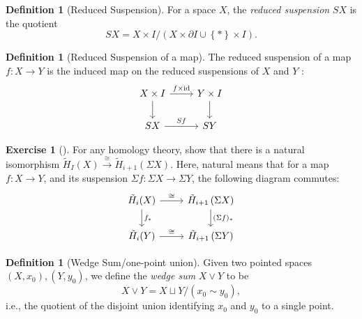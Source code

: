 \documentclass[reqno]{amsart}
\theoremstyle{definition}
\newtheorem{definition}[theorem]{Definition}
\newtheorem{exercise}[theorem]{Exercise}
\theoremstyle{remark}
\newcommand{\id}{{\mathrm{id}}}
\begin{document}
\begin{definition}[Reduced Suspension]
    For a space $X$, the \textit{reduced suspension}
    $SX$ is the quotient
    \[
    SX = X \times I / \left( X \times \partial I
    \cup \left\{ * \right\} \times I \right) .
    \] 
\end{definition}

\begin{definition}[Reduced Suspension of a map]
    The reduced suspension of a map $f \colon X \to Y$ is
    the induced map on the reduced suspensions of
    $X$ and $Y$ :
    \begin{equation*}
    \begin{tikzcd}
        X \times I \ar[r, "f \times \id"]
        \ar[d] & Y \times I \ar[d] \\
        SX \ar[r, "Sf"] & SY
    \end{tikzcd}
    \end{equation*}
    
\end{definition}

\begin{exercise}[]
    For any homology theory, show that
    there is a natural isomorphism
    $\tilde{H}_I (X) \stackrel{\cong}{\to} 
    \tilde{H}_{i+1} \left( \Sigma X \right) $. Here,
    natural means that for a map $f \colon X \to Y$,
    and its suspension $\Sigma f \colon \Sigma X \to 
    \Sigma Y$, the following diagram commutes:
    \begin{equation*}
    \begin{tikzcd}
        \tilde{H}_i (X) \ar[r, "\cong"] \ar[d, "f_*"]& 
        \tilde{H}_{i+1} \left( \Sigma X \right)
        \ar[d, "(\Sigma f)_*"] \\
        \tilde{H}_i (Y) \ar[r, "\cong"] & \tilde{H}_{i+1}
        \left( \Sigma Y \right) 
    \end{tikzcd}
    \end{equation*}
    
\end{exercise}


\begin{definition}[Wedge Sum/one-point union]
    Given two pointed spaces $(X, x_0), \left( Y, y_0 \right) $,
    we define
    the \textit{wedge sum}  $X \vee Y$ to be
    \[
    X \vee Y = X \sqcup Y / \left( x_0 \sim y_0 \right) ,
    \] 
    i.e., the quotient of the disjoint union identifying
    $x_0$ and $y_0$ to a single point.
\end{definition}
\end{document}
